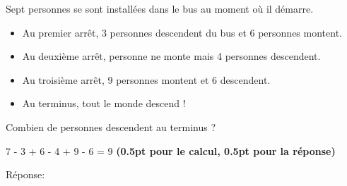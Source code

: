 
\question[1\half]
Sept personnes se sont installées dans le bus au moment où il démarre.

\begin{itemize}
\item Au premier arrêt, 3 personnes descendent du bus et 6 personnes montent.
\item Au deuxième arrêt, personne ne monte mais 4 personnes descendent.
\item Au troisième arrêt, 9 personnes montent et 6 descendent.
\item Au terminus, tout le monde descend !
\end{itemize}

\vspace{10pt}
 Combien de personnes descendent au terminus ?

\vspace{10pt}{\footnotesize\raggedleft Espace pour ta démarche et tes calculs\par}
\begin{solutionorgrid}[80pt]
7 - 3 + 6 - 4 + 9 - 6   = 9 \textbf{(0.5pt pour le calcul, 0.5pt pour la réponse)}
\end{solutionorgrid}

\begin{tcolorbox}[enhanced jigsaw, interior hidden, colframe=box, parbox=false]%
Réponse: 
\end{tcolorbox}
